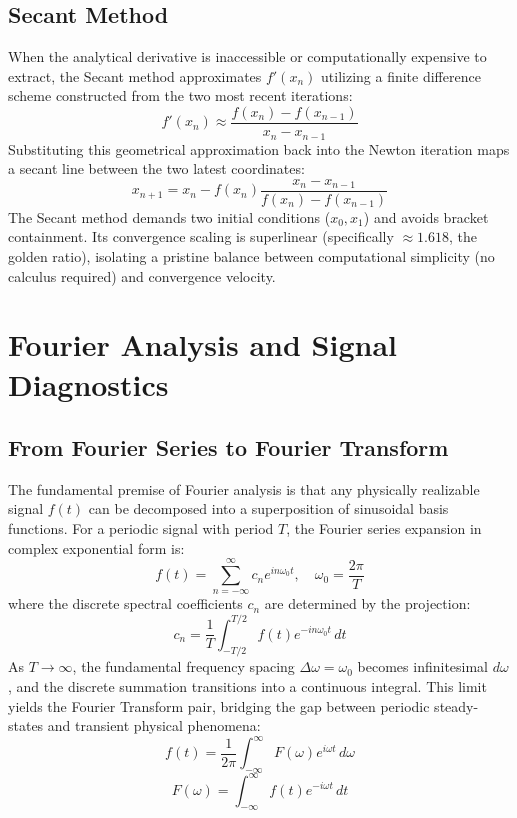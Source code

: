 \documentclass[aps, reprint, twocolumn, superscriptaddress, floatfix]{revtex4-2}
\begin{document}
\subsection{Secant Method}
When the analytical derivative is inaccessible or computationally expensive to extract, the Secant method approximates $f'(x_n)$ utilizing a finite difference scheme constructed from the two most recent iterations:
\begin{equation}
    f'(x_n) \approx \frac{f(x_n) - f(x_{n-1})}{x_n - x_{n-1}}
\end{equation}
Substituting this geometrical approximation back into the Newton iteration maps a secant line between the two latest coordinates:
\begin{equation}
    x_{n+1} = x_n - f(x_n) \frac{x_n - x_{n-1}}{f(x_n) - f(x_{n-1})}
\end{equation}
The Secant method demands two initial conditions ($x_0, x_1$) and avoids bracket containment. Its convergence scaling is superlinear (specifically $\approx 1.618$, the golden ratio), isolating a pristine balance between computational simplicity (no calculus required) and convergence velocity.

\section{Fourier Analysis and Signal Diagnostics}

\subsection{From Fourier Series to Fourier Transform}

The fundamental premise of Fourier analysis is that any physically realizable signal $f(t)$ can be decomposed into a superposition of sinusoidal basis functions. For a periodic signal with period $T$, the Fourier series expansion in complex exponential form is:
\begin{equation}
    f(t) = \sum_{n=-\infty}^{\infty} c_n e^{i n \omega_0 t}, \quad \omega_0 = \frac{2\pi}{T}
\end{equation}
where the discrete spectral coefficients $c_n$ are determined by the projection:
\begin{equation}
    c_n = \frac{1}{T} \int_{-T/2}^{T/2} f(t) e^{-i n \omega_0 t} \, dt
\end{equation}
As $T \to \infty$, the fundamental frequency spacing $\Delta \omega = \omega_0$ becomes infinitesimal $d\omega$, and the discrete summation transitions into a continuous integral. This limit yields the Fourier Transform pair, bridging the gap between periodic steady-states and transient physical phenomena:
\begin{equation}
    f(t) = \frac{1}{2\pi} \int_{-\infty}^{\infty} F(\omega) e^{i\omega t} \, d\omega
\end{equation}
\begin{equation}
    F(\omega) = \int_{-\infty}^{\infty} f(t) e^{-i\omega t} \, dt
\end{equation}
\end{document}
